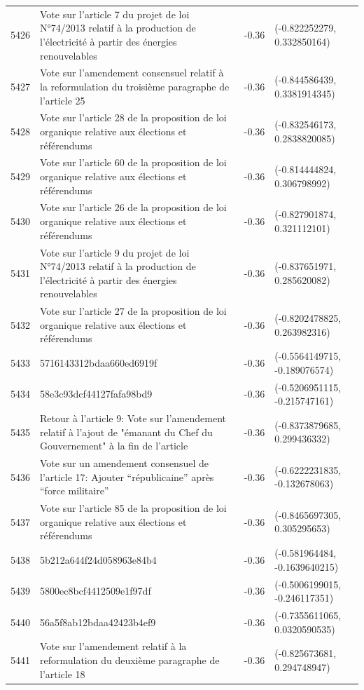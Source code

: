 \begin{table}[ht]
\begin{tabular}{rlrl}
  5426 & Vote sur l'article 7 du projet de loi N°74/2013 relatif à la production de l'électricité à partir des énergies renouvelables & -0.36 & (-0.822252279, 0.332850164) \\ 
  5427 & Vote sur l'amendement consensuel relatif à la reformulation du troisième paragraphe de l'article 25 & -0.36 & (-0.844586439, 0.3381914345) \\ 
  5428 & Vote sur l'article 28 de la proposition de loi organique relative aux élections et référendums & -0.36 & (-0.832546173, 0.2838820085) \\ 
  5429 & Vote sur l'article 60 de la proposition de loi organique relative aux élections et référendums & -0.36 & (-0.814444824, 0.306798992) \\ 
  5430 & Vote sur l'article 26 de la proposition de loi organique relative aux élections et référendums & -0.36 & (-0.827901874, 0.321112101) \\ 
  5431 & Vote sur l'article 9 du projet de loi N°74/2013 relatif à la production de l'électricité à partir des énergies renouvelables & -0.36 & (-0.837651971, 0.285620082) \\ 
  5432 & Vote sur l'article 27 de la proposition de loi organique relative aux élections et référendums & -0.36 & (-0.8202478825, 0.263982316) \\ 
  5433 & 5716143312bdaa660ed6919f & -0.36 & (-0.5564149715, -0.189076574) \\ 
  5434 & 58e3c93dcf44127fafa98bd9 & -0.36 & (-0.5206951115, -0.215747161) \\ 
  5435 & Retour à l'article 9: Vote sur l'amendement relatif à l'ajout de "émanant du Chef du Gouvernement" à la fin de l'article & -0.36 & (-0.8373879685, 0.299436332) \\ 
  5436 & Vote sur un amendement consensuel de l'article 17: Ajouter “républicaine” après “force militaire” & -0.36 & (-0.6222231835, -0.132678063) \\ 
  5437 & Vote sur l'article 85 de la proposition de loi organique relative aux élections et référendums & -0.36 & (-0.8465697305, 0.305295653) \\ 
  5438 & 5b212a644f24d058963e84b4 & -0.36 & (-0.581964484, -0.1639640215) \\ 
  5439 & 5800ec8bcf4412509e1f97df & -0.36 & (-0.5006199015, -0.246117351) \\ 
  5440 & 56a5f8ab12bdaa42423b4ef9 & -0.36 & (-0.7355611065, 0.0320590535) \\ 
  5441 & Vote sur l'amendement relatif à la reformulation du deuxième paragraphe de l'article 18 & -0.36 & (-0.825673681, 0.294748947) \\ 

\end{tabular}
\end{table}

